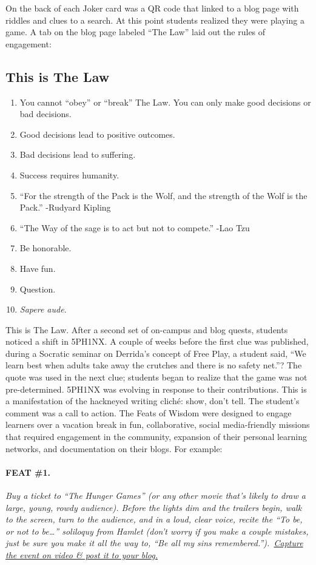On the back of each Joker card was a QR code that linked
to a blog page with riddles and clues to a search. At this point
students realized they were playing a game. A tab on the blog page
labeled ``The Law'' laid out the rules of engagement:

\subsection{This is The Law}

\begin{enumerate}
\itemsep1pt\parskip0pt
\item
  You cannot ``obey'' or ``break'' The Law. You can only make good
  decisions or bad decisions.
\item
  Good decisions lead to positive outcomes.
\item
  Bad decisions lead to suffering.
\item
  Success requires humanity.
\item
  ``For the strength of the Pack is the Wolf, and the strength of the
  Wolf is the Pack.'' -Rudyard Kipling
\item
  ``The Way of the sage is to act but not to compete.'' -Lao Tzu
\item
  Be honorable.
\item
  Have fun.
\item
  Question.
\item
  \emph{Sapere aude}.
\end{enumerate}

This is The Law. After a second set of on-campus and blog quests,
students noticed a shift in 5PH1NX. A couple of weeks before the first
clue was published, during a Socratic seminar on Derrida's concept of
Free Play, a student said, ``We learn best when adults take away the
crutches and there is no safety net.''? The quote was used in the next
clue; students began to realize that the game was not pre-determined.
5PH1NX was evolving in response to their contributions. This is a
manifestation of the hackneyed writing cliché: show, don't tell. The
student's comment was a call to action. The Feats of Wisdom were
designed to engage learners over a vacation break in fun, collaborative,
social media-friendly missions that required engagement in the
community, expansion of their personal learning networks, and
documentation on their blogs. For example:

\paragraph{FEAT \#1.} \emph{Buy a ticket to ``The Hunger Games'' (or any other movie that's
likely to draw a large, young, rowdy audience). Before the lights dim
and the trailers begin, walk to the screen, turn to the audience, and in
a loud, clear voice, recite the ``To be, or not to be\ldots{}''
soliloquy from Hamlet (don't worry if you make a couple mistakes, just
be sure you make it all the way to, ``Be all my sins
remembered.'').~\href{http://alarhsenglitcomp.blogspot.com/2012/12/feats-of-wisdom-1_15.html}{Capture
the event on video \& post it to your blog.}} 

